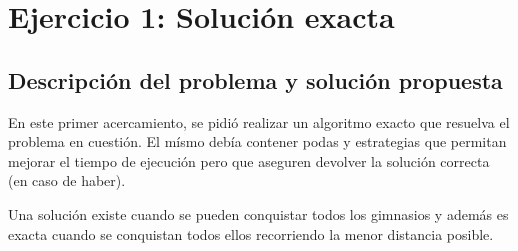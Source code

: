 \section{Ejercicio 1: Solución exacta}


    \subsection{Descripción del problema y solución propuesta}
        En este primer acercamiento, se pidió realizar un algoritmo exacto que resuelva el problema en cuestión. El mísmo debía contener podas y estrategias que permitan mejorar el tiempo de ejecución pero que aseguren devolver la solución correcta (en caso de haber).

        Una solución existe cuando se pueden conquistar todos los gimnasios y además es exacta cuando se conquistan todos ellos recorriendo la menor distancia posible.

